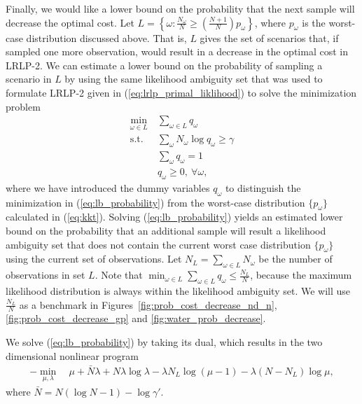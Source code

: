 \documentclass[11pt]{article}
\begin{document}
Finally, we would like a lower bound on the probability that the next sample will decrease the optimal cost.
Let $L = \left\{ \omega : \frac{N_{\omega}}{N} \geq \left( \frac{N+1}{N} \right) p_\omega \right\}$, where $p_\omega$ is the worst-case distribution discussed above.
That is, $L$ gives the set of scenarios that, if sampled one more observation, would result in a decrease in the optimal cost in LRLP-2.
We can estimate a lower bound on the probability of sampling a scenario in $L$ by using the same likelihood ambiguity set that was used to formulate LRLP-2 given in (\ref{eq:lrlp_primal_liklihood}) to solve the minimization problem
\begin{align}
	\min_{\omega \in L} \ & \sum_{\omega \in L} q_\omega \nonumber \\
	\mbox{s.t.} & \sum_\omega N_\omega \log q_\omega \geq \gamma \label{eq:lb_probability} \\
	& \sum_\omega q_\omega = 1 \nonumber \\
	& q_\omega \geq 0, \ \forall \omega, \nonumber
\end{align}
where we have introduced the dummy variables $q_\omega$ to distinguish the minimization in (\ref{eq:lb_probability}) from the worst-case distribution $\{p_\omega\}$ calculated in (\ref{eq:kkt}). 
Solving (\ref{eq:lb_probability}) yields an estimated lower bound on the probability that an additional sample will result a likelihood ambiguity set that does not contain the current worst case distribution $\{p_\omega\}$ using the current set of observations. 
Let $N_L = \sum_{\omega \in L} N_\omega$ be the number of observations in set $L$. Note that $\min_{\omega \in L} \sum_{\omega \in L} q_\omega \leq \frac{N_L}{N}$, because the maximum likelihood distribution is always within the likelihood ambiguity set. We will use $\frac{N_L}{N}$ as a benchmark in Figures~\ref{fig:prob_cost_decrease_nd_n}, \ref{fig:prob_cost_decrease_gp} and \ref{fig:water_prob_decrease}. 

We solve (\ref{eq:lb_probability}) by taking its dual, which results in the two dimensional nonlinear program
\begin{align}
	-\min_{\mu,\lambda} \ & \mu + \bar{N}\lambda + N\lambda\log\lambda - \lambda N_L \log(\mu - 1) - \lambda (N-N_L) \log\mu, \label{eq:prob_cost_decrease}
\end{align}
where $\bar{N} = N(\log N - 1) - \log\gamma'$.
\end{document}
